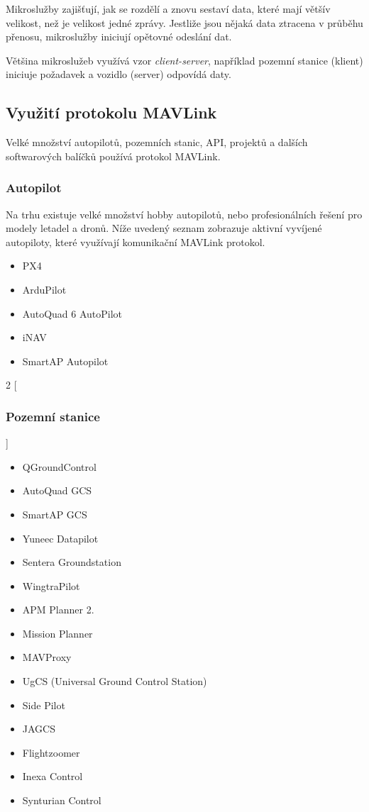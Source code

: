 Mikroslužby zajišťují, jak se rozdělí a znovu sestaví data, které mají většív velikost, než je velikost jedné zprávy. Jestliže jsou nějaká data ztracena v průběhu přenosu, mikroslužby iniciují opětovné odeslání dat.

Většina mikroslužeb využívá vzor \textit{client-server}, například pozemní stanice (klient) iniciuje požadavek a vozidlo (server) odpovídá daty.

\subsection{Využití protokolu MAVLink}

Velké množství autopilotů, pozemních stanic, \acs{API}, projektů a dalších softwarových balíčků používá protokol MAVLink.

\subsubsection{Autopilot}

Na trhu existuje velké množství hobby autopilotů, nebo profesionálních řešení pro modely letadel a dronů. Níže uvedený seznam zobrazuje aktivní vyvíjené autopiloty, které využívají komunikační MAVLink protokol.  \cite{MAVLINK}

\begin{itemize}
    \item PX4
    \item ArduPilot
    \item AutoQuad 6 AutoPilot
    \item iNAV
    \item SmartAP Autopilot\\
\end{itemize}


\begin{multicols}{2}
[
\subsubsection{Pozemní stanice}
]
    \begin{itemize}
        \item QGroundControl
        \item AutoQuad GCS
        \item SmartAP GCS
        \item Yuneec Datapilot
        \item Sentera Groundstation
        \item WingtraPilot
        \item APM Planner 2.
        \item Mission Planner
        \item MAVProxy
        \item UgCS (Universal Ground Control Station)
        \item Side Pilot
        \item JAGCS
        \item Flightzoomer
        \item Inexa Control
        \item Synturian Control
    \end{itemize}
\end{multicols}

